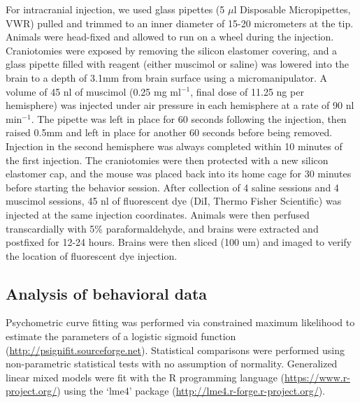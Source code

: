 For intracranial injection, we used glass pipettes (5 $\mu$l Disposable
Micropipettes, VWR) pulled and trimmed to an inner diameter of 15-20
micrometers at the tip. Animals were head-fixed and allowed to run on a wheel
during the injection. Craniotomies were exposed by removing the silicon
elastomer covering, and a glass pipette filled with reagent (either muscimol or
saline) was lowered into the brain to a depth of 3.1mm from brain surface using
a micromanipulator. A volume of 45 nl of muscimol (0.25 mg ml$^{-1}$, final
dose of 11.25 ng per hemisphere) was injected under air pressure in each
hemisphere at a rate of 90 nl min$^{-1}$.
%
%
The pipette was left in place for 60 seconds following the injection, then
raised 0.5mm and left in place for another 60 seconds before being removed.
Injection in the second hemisphere was always completed within 10 minutes of
the first injection. The craniotomies were then protected with a new silicon
elastomer cap, and the mouse was placed back into its home cage for 30 minutes
before starting the behavior session. After collection of 4 saline sessions and
4 muscimol sessions, 45 nl of fluorescent dye (DiI, Thermo Fisher Scientific)
was injected at the same injection coordinates. Animals were then perfused
transcardially with 5\% paraformaldehyde, and brains were extracted and
postfixed for 12-24 hours. Brains were then sliced (100 um) and imaged to
verify the location of fluorescent dye injection.

\subsection{Analysis of behavioral data}

Psychometric curve fitting was performed via constrained maximum likelihood to
estimate the parameters of a logistic sigmoid function
(\url{http://psignifit.sourceforge.net}). Statistical comparisons were
performed using non-parametric statistical tests with no assumption of
normality. 
%
Generalized linear mixed models were fit with the R programming language
(\url{https://www.r-project.org/}) using the `lme4' package
(\url{http://lme4.r-forge.r-project.org/}).


